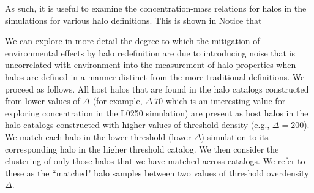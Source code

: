 \documentclass[usenatbib,usegraphicx,letterpaper]{mn2e}
\begin{document}


As such, it is useful to examine the concentration-mass relations for halos in 
the simulations for various halo definitions. This is shown in  
Notice that 


We can explore in more detail the degree to which the mitigation of environmental 
effects by halo redefinition are due to introducing noise that is uncorrelated with 
environment into the measurement of halo properties when halos are defined 
in a manner distinct from the more traditional definitions. We proceed as follows. 
All host halos that are found in the halo catalogs constructed from lower values 
of $\Delta$ (for example, $\Delta ~ 70$ which is an interesting value for exploring 
concentration in the L0250 simulation) are present as host halos in the halo 
catalogs constructed with higher values of threshold density (e.g., $\Delta = 200$). 
We match each halo in the lower threshold (lower $\Delta$) simulation to 
its corresponding halo in the higher threshold catalog. We then consider 
the clustering of only those halos that we have matched across catalogs. 
We refer to these as the ``matched" halo samples between two values 
of threshold overdensity $\Delta$. 

\end{document}
